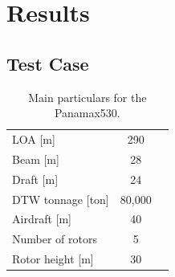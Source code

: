 \documentclass[twoside,twocolumn]{article}
\begin{document}
\begin{table}[]
\caption{Network hyperparameters used to build the feed forward neural network}
\label{tab:network_parameters}
\end{table}


\section{Results}

\subsection{Test Case}


\begin{table}[!th]
	\caption{Main particulars for the Panamax530.}    
	\begin{tabular}{lSS}
		\toprule
		                                    &              \\ \midrule
		LOA [m]                             & 290          \\
		Beam [m]                            & 28           \\
		Draft [m]                           & 24          \\
		DTW tonnage [ton]                   & 80,000      \\
		Airdraft [m]						& 40	\\
		Number of rotors                    & 5        \\
		Rotor height [m]                    & 30        \\ \bottomrule
	\end{tabular}
	\label{tab:mainparticularsA}
\end{table}
\end{document}
